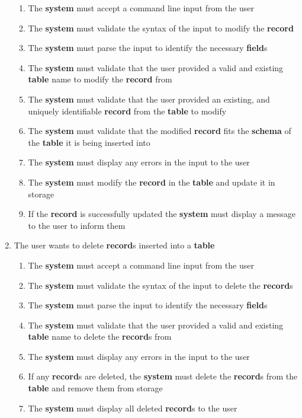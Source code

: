 \documentclass[12pt, titlepage]{article}
\begin{document}
\begin{enumerate}[{BE}1.]
\begin{enumerate}[{FR}1.]
        \item The \textbf{system} must accept a command line input from the user
        \item The \textbf{system} must validate the syntax of the input to modify the \textbf{record}
        \item The \textbf{system} must parse the input to identify the necessary \textbf{field}s
        \item The \textbf{system} must validate that the user provided a valid and existing \textbf{table} name to modify the \textbf{record} from
        \item The \textbf{system} must validate that the user provided an existing, and uniquely identifiable \textbf{record} from the \textbf{table} to modify
        \item The \textbf{system} must validate that the modified \textbf{record} fits the \textbf{schema} of the \textbf{table} it is being inserted into
        \item The \textbf{system} must display any errors in the input to the user
        \item The \textbf{system} must modify the \textbf{record} in the \textbf{table} and update it in storage
        \item If the \textbf{record} is successfully updated the \textbf{system} must display a message to the user to inform them
    \end{enumerate}
    \item The user wants to delete \textbf{record}s inserted into a \textbf{table}
    \begin{enumerate}[{FR}1.]
        \item The \textbf{system} must accept a command line input from the user
        \item The \textbf{system} must validate the syntax of the input to delete the \textbf{record}s
        \item The \textbf{system} must parse the input to identify the necessary \textbf{field}s
        \item The \textbf{system} must validate that the user provided a valid and existing \textbf{table} name to delete the \textbf{record}s from
        \item The \textbf{system} must display any errors in the input to the user
        \item If any \textbf{record}s are deleted, the \textbf{system} must delete the \textbf{record}s from the \textbf{table} and remove them from storage
        \item The \textbf{system} must display all deleted \textbf{record}s to the user

\end{enumerate}
\end{enumerate}
\end{document}
